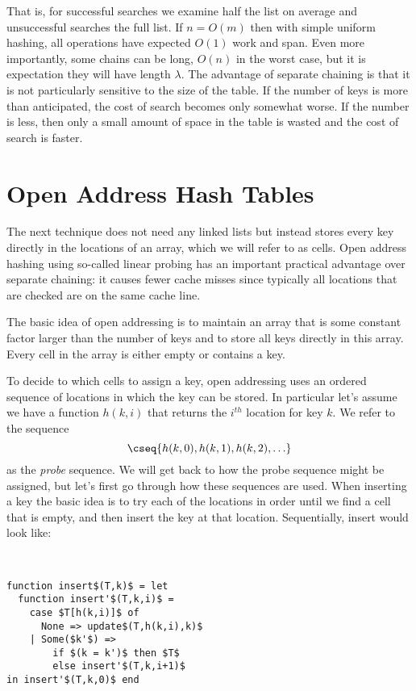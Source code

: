 That is, for successful searches we examine half the list on average
and unsuccessful searches the full list.  If $n = O(m)$ then with
simple uniform hashing, all operations have expected $O(1)$ work and
span.  Even more importantly, some chains can be long, $O(n)$ in the
worst case, but it is expectation they will have length $\lambda$.
The advantage of separate chaining is that it is not particularly
sensitive to the size of the table.  If the number of keys is more
than anticipated, the cost of search becomes only somewhat worse. If
the number is less, then only a small amount of space in the table is
wasted and the cost of search is faster.

\section{Open Address Hash Tables}

The next technique does not need any linked lists but instead stores
every key directly in the locations of an array, which we will refer
to as cells.  Open address hashing using so-called linear probing has
an important practical advantage over separate chaining: it causes
fewer cache misses since typically all locations that are checked are
on the same cache line.

The basic idea of open addressing is to maintain an array that is some
constant factor larger than the number of keys and to store all keys
directly in this array.  Every cell in the array is either empty or
contains a key.

To decide to which cells to assign a key, open addressing uses an
ordered sequence of locations in which the key can be stored.  In
particular let's assume we have a function $h(k,i)$ that returns the
$i^{th}$ location for key $k$.  We refer to the sequence
\[\cseq{h(k,0), h(k,1), h(k,2), \ldots}\] as the \emph{probe} sequence.
We will get back to how the probe sequence might be assigned, but
let's first go through how these sequences are used.  When inserting a
key the basic idea is to try each of the locations in order until we
find a cell that is empty, and then insert the key at that location.
Sequentially, insert would look like:

\begin{algorithm}~
\begin{lstlisting}
function insert$(T,k)$ = let
  function insert'$(T,k,i)$ =
    case $T[h(k,i)]$ of
      None => update$(T,h(k,i),k)$
    | Some($k'$) => 
        if $(k = k')$ then $T$
        else insert'$(T,k,i+1)$
in insert'$(T,k,0)$ end
\end{lstlisting}
\end{algorithm}


